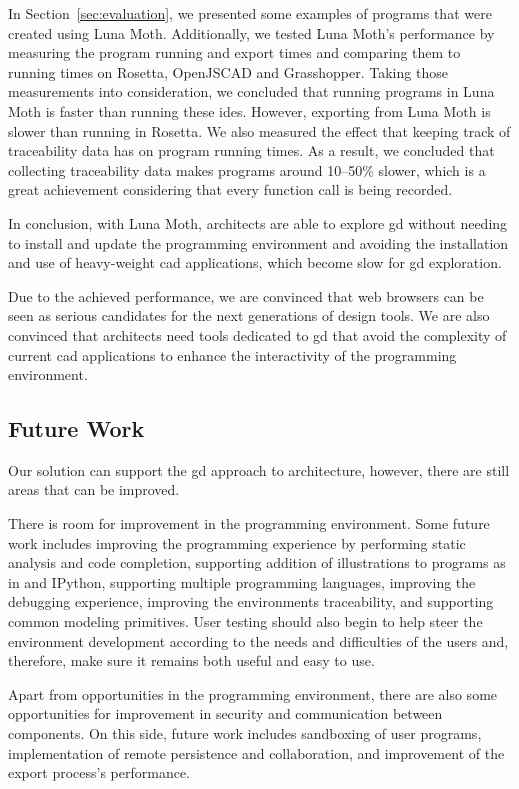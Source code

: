 In Section~\ref{sec:evaluation}, we presented some examples of programs that were created using Luna Moth.
Additionally, we tested Luna Moth's performance by measuring the program running and export times and comparing them to running times on Rosetta, OpenJSCAD and Grasshopper.
Taking those measurements into consideration, we concluded that running programs in Luna Moth is faster than running these \glspl{ide}.
However, exporting from Luna Moth is slower than running in Rosetta.
We also measured the effect that keeping track of traceability data has on program running times.
As a result, we concluded that collecting traceability data makes programs around 10--50\% slower, which is a great achievement considering that every function call is being recorded.

In conclusion, with Luna Moth, architects are able to explore \gls{gd} without needing to install and update the programming environment and avoiding the installation and use of heavy-weight \gls{cad} applications, which become slow for \gls{gd} exploration.

Due to the achieved performance, we are convinced that web browsers can be seen as serious candidates for the next generations of design tools.
We are also convinced that architects need tools dedicated to \gls{gd} that avoid the complexity of current \gls{cad} applications to enhance the interactivity of the programming environment.

\subsection{Future Work}
Our solution can support the \gls{gd} approach to architecture, however, there are still areas that can be improved.

There is room for improvement in the programming environment.
Some future work includes improving the programming experience by performing static analysis and code completion, supporting addition of illustrations to programs as in \cite{Leitao2014illustrated} and IPython, supporting multiple programming languages, improving the debugging experience, improving the environments traceability, and supporting common modeling primitives.
User testing should also begin to help steer the environment development according to the needs and difficulties of the users and, therefore, make sure it remains both useful and easy to use.

Apart from opportunities in the programming environment, there are also some opportunities for improvement in security and communication between components.
On this side, future work includes sandboxing of user programs, implementation of remote persistence and collaboration, and improvement of the export process's performance.
